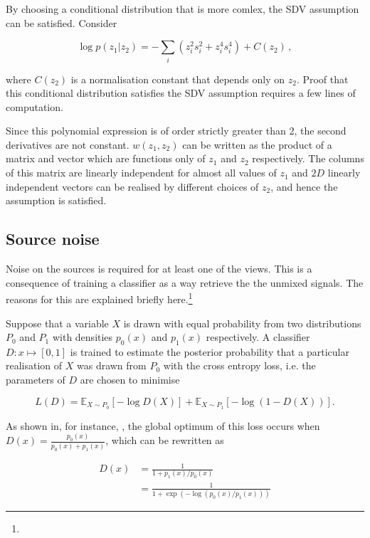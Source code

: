 By choosing a conditional distribution  that is more comlex, the SDV assumption can be satisfied. Consider

\begin{equation}
\log p(z_1|z_2) =  - \sum_i (z_i^2  s_i^2 + z_i^4 s_i^4  ) + C(z_2) \,, \label{eq:satisfied}
\end{equation}

where $C(z_2)$ is a normalisation constant that depends only on $z_2$.
Proof that this conditional distribution satisfies the SDV assumption requires a few lines of computation.

Since this polynomial expression is of order strictly greater than 2, the second derivatives are not constant.
${w}(z_1, z_2)$ can be written as the product of a matrix and vector which are functions only of $z_1$ and $z_2$ respectively.
The columns of this matrix are linearly independent for almost all values of $z_1$ and $2D$ linearly independent vectors can be realised by different choices of $z_2$, and hence the assumption is satisfied.


\subsection{Source noise}\label{sec:converged}

Noise on the sources is required for at least one of the views. 
This is a consequence of training a classifier as a way retrieve the the unmixed signals.
The reasons for this are explained briefly here.\footnote{}


Suppose that a variable $X$ is drawn with equal probability from two distributions $P_0$ and $P_1$ with densities $p_0(x)$ and $p_1(x)$ respectively.
A classifier $D: x \mapsto [0,1]$ is trained to estimate the posterior probability that a particular realisation of $X$ was drawn from $P_0$ with the cross entropy loss, i.e. the parameters of $D$ are chosen to minimise

\[
L(D) = \mathbb{E}_{X\sim P_0} \left[ - \log D(X) \right] + \mathbb{E}_{X\sim P_1} \left[ - \log (1 - D(X)) \right].
\]

As shown in, for instance, \cite{goodfellow2014generative}, the global optimum of this loss occurs when $D(x) = \frac{p_0(x)}{p_0(x) + p_1(x)}$, which can be rewritten as

\begin{align}
D(x) &= \frac{1}{1 + p_1(x)/p_0(x)}\\
&= \frac{1}{1 + \exp ( - \log (p_0(x)/p_1(x))) } \label{eq:density-ratio-classification}
\end{align}

